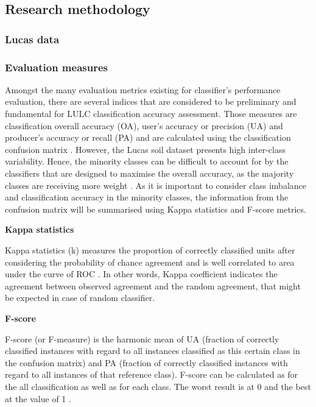 \documentclass[parskip=full]{scrartcl}
\begin{document}
\subsection{Research methodology}

\subsubsection{Lucas data}


\subsubsection{Evaluation measures}
Amongst the many evaluation metrics existing for classifier's performance
evaluation, there are several indices that are considered to be preliminary and
fundamental for LULC classification accuracy assessment. Those measures are classification overall accuracy (OA), user's accuracy or precision (UA) and producer's accuracy or recall (PA) and are calculated using the classification confusion matrix \cite{Liu2007}. However, the Lucas soil dataset presents high inter-class variability. Hence, the minority classes can be difficult to account for by the classifiers that are designed to maximise the overall accuracy, as the majority classes are receiving more weight \cite{Inglada2017}. As it is important to consider class imbalance and classification accuracy in the minority classes, the information from the confusion matrix will be summarised using Kappa statistics and F-score metrics.

\textbf{Kappa statistics}

Kappa statistics (k) measures the proportion of correctly classified units after
considering the probability of chance agreement and is well correlated to area
under the curve of ROC \cite{Freeman2012}. In other words, Kappa coefficient
indicates the agreement between observed agreement and the random agreement,
that might be expected in case of random classifier.

\textbf{F-score}

F-score (or F-measure) is the harmonic mean of UA (fraction of correctly
classified instances with regard to all instances classified as this certain
class in the confusion matrix) and PA (fraction of correctly classified
instances with regard to all instances of that reference class). F-score can be
calculated as for the all classification as well as for each class. The worst
result is at 0 and the best at the value of 1 \cite{Inglada2017}.





\end{document}
